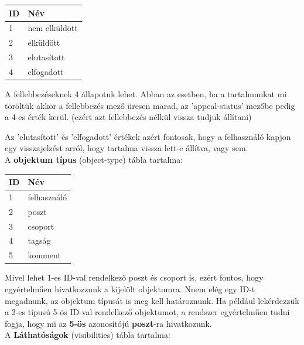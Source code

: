 \documentclass[
]{thesis-ekf}
\theoremstyle{definition}
\theoremstyle{remark}
\begin{document}
\begin{table}[H]
	\begin{tabular}{|l|l|}
		\hline
		\rule{0pt}{4ex}\rule[-2ex]{0pt}{0pt}
		\textbf{ID} &
		\textbf{Név} \\
		\hline
		1 &
		nem elküldött \\
		\hline
		2 &
		elküldött \\
		\hline
		3 &
		elutasított \\
		\hline
		4 &
		elfogadott \\
		\hline
	\end{tabular}
\end{table}
\noindent
A fellebbezéseknek 4 állapotuk lehet. Abban az esetben, ha a tartalmunkat mi töröltük akkor a fellebbezés mező üresen marad, az 'appeal-status' mezőbe pedig a 4-es érték kerül. (ezért azt fellebbezés nélkül vissza tudjuk állítani)

Az 'elutasított' és 'elfogadott' értékek azért fontosak, hogy a felhasználó kapjon egy visszajelzést arról, hogy tartalma vissza lett-e állítva, vagy sem.
\vspace{5mm}
\\
\noindent
A \textbf{objektum típus} (object-type) tábla tartalma:

\begin{table}[H]
	\begin{tabular}{|l|l|}
		\hline
		\rule{0pt}{4ex}\rule[-2ex]{0pt}{0pt}
		\textbf{ID} &
		\textbf{Név} \\
		\hline
		1 &
		felhasználó \\
		\hline
		2 &
		poszt \\
		\hline
		3 &
		csoport \\
		\hline
		4 &
		tagság \\
		\hline
		5 &
		komment \\
		\hline
	\end{tabular}
\end{table}
\noindent
Mivel lehet 1-es ID-val rendelkező poszt és csoport is, ezért fontos, hogy egyértelműen hivatkozzunk a kijelölt objektumra. Nnem elég egy ID-t megadnunk, az objektum típusát is meg kell határoznunk. Ha például lekérdezzük a 2-es típusú 5-ös ID-val rendelkező objektumot, a rendszer egyértelműen tudni fogja, hogy mi az \textbf{5-ös} azonosítójú \textbf{poszt}-ra hivatkozunk.
\vspace{5mm}
\\
\noindent
A \textbf{Láthatóságok} (visibilities) tábla tartalma:
\end{document}
